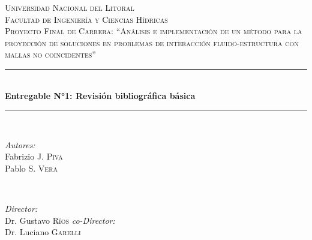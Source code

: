 \begin{titlepage}

  \newcommand{\HRule}{\rule{\linewidth}{0.5mm}} %

  \center %
 

  \textsc{\LARGE Universidad Nacional del
    Litoral}\\[1.5cm] %
  \textsc{\Large Facultad de Ingeniería y Ciencias Hídricas
  }\\[0.5cm] %
  \textsc{\large Proyecto Final de Carrera:
    ``Análisis e implementación de un método para la proyección de
    soluciones en problemas de interacción fluido-estructura con mallas no coincidentes''}\\[0.5cm] %


  \HRule \\[0.4cm]
  { \huge \bfseries Entregable N°1:
    Revisión bibliográfica básica}\\[0.4cm] %
  \HRule \\[1.0cm]
 

  \begin{minipage}{0.4\textwidth}
    \begin{flushleft} \large
      \emph{Autores:}\\
        Fabrizio J. \textsc{Piva} \\ %
        Pablo S. \textsc{Vera} \\ %
    \end{flushleft}
  \end{minipage}
  ~
  \begin{minipage}{0.4\textwidth}
    \begin{flushright} \large
      \emph{Director:} \\
      Dr. Gustavo \textsc{Ríos} %
      \emph{co-Director:} \\
      Dr. Luciano \textsc{Garelli} %
    \end{flushright}
  \end{minipage}\\[1cm]


\end{titlepage}
